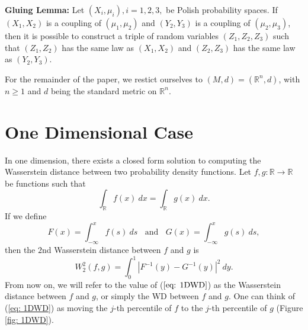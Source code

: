 \documentclass[10pt]{article}
\begin{document}
\noindent \textbf{Gluing Lemma:} Let $(X_i, \mu_i), i = 1, 2, 3,$ be Polish probability spaces. If $(X_1, X_2)$ is a coupling of $(\mu_1, \mu_2)$ and $(Y_2, Y_3) $ is a coupling of $(\mu_2, \mu_3)$, then it is possible to construct a triple of random variables $(Z_1, Z_2, Z_3)$ such that $(Z_1, Z_2)$ has the same law as $(X_1, X_2)$ and $(Z_2, Z_3)$ has the same law as $(Y_2, Y_3)$.

\noindent For the remainder of the paper, we restict ourselves to $(M,d) = (\mathbb{R}^n, d)$, with $n \geq 1$ and $d$ being the standard metric on $\mathbb{R}^n$. 

\section{One Dimensional Case} \label{sec: OneD}
In one dimension, there exists a closed form solution to computing the Wasserstein distance between two probability density functions. Let $f, g: \mathbb{R} \rightarrow \mathbb{R}$ be functions such that
\begin{equation}
\int_{\mathbb{R}} f(x) \ dx = \int_{\mathbb{R}} g(x) \ dx.
\end{equation}
If we define
\begin{equation}
F(x) = \int_{- \infty}^x f(s) \ ds \ \ \ \ \text{and} \ \ \ \ G(x) = \int_{- \infty}^x g(s) \ ds,
\end{equation}
then the $2$nd Wasserstein distance between $f$ and $g$ is
\begin{equation}
W_2^2(f, g) = {\int_{0}^1 |F^{-1}(y) - G^{-1}(y)|^2 \ dy}.
\label{eq: 1DWD}
\end{equation}
From now on, we will refer to the value of ($\ref{eq: 1DWD}$) as the Wasserstein distance between $f$ and $g$, or simply the WD between $f$ and $g$.
One can think of (\ref{eq: 1DWD}) as moving the $j$-th percentile of $f$ to the $j$-th percentile of $g$ (Figure \ref{fig: 1DWD}).
\end{document}

